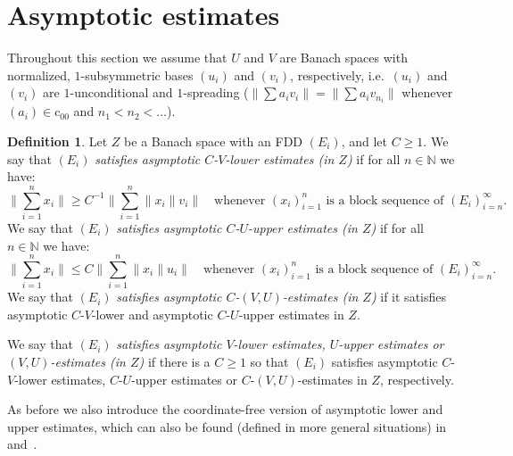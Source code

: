 \documentclass[11pt,leqno]{amsart}
\theoremstyle{definition}
\newtheorem*{defin}{Definition}
\newcommand{\N}{\mathbb{N}}
\newcommand{\coo}{\mathrm{c}_{00}}
\begin{document}
\section{Asymptotic estimates}\label{S:4}

Throughout this section we assume that $U$ and $V$ are Banach spaces
with normalized, $1$-subsymmetric bases $(u_i)$ and $(v_i)$,
respectively, i.e.~$(u_i)$ and $(v_i)$ are $1$-unconditional and
$1$-spreading ($\|\sum a_i v_i\|=\|\sum a_i v_{n_i}\|$ whenever
$(a_i)\in \coo$ and $n_1<n_2<\ldots$).
\begin{defin}
  Let $Z$ be a Banach space with an FDD $(E_i)$, and let $C\ge 1$. We
  say that $(E_i)$ {\em satisfies asymptotic $C$-$V$-lower estimates
    (in $Z$) }if for all $n\in\N$ we have:
  \begin{equation*}
    \Big\|\sum_{i=1}^n x_i\Big\|\ge C^{-1} \Big\|\sum_{i=1}^n
    \|x_i\|v_i\Big\|\quad\text{whenever $(x_i)_{i=1}^n$ is a block
      sequence of $(E_i)_{i=n}^\infty$}.
  \end{equation*}
  We say that $(E_i)$ {\em satisfies asymptotic $C$-$U$-upper
    estimates (in $Z$) }if for all $n\in\N$ we have:
  \begin{equation*}
    \Big\|\sum_{i=1}^n x_i\Big\|\le C \Big\|\sum_{i=1}^n
    \|x_i\|u_i\Big\|\quad\text{whenever $(x_i)_{i=1}^n$ is a block
      sequence of $(E_i)_{i=n}^\infty$}.
  \end{equation*}
  We say that $(E_i)$ {\em satisfies asymptotic $C$-$(V,U)$-estimates
    (in $Z$)} if it satisfies asymptotic $C$-$V$-lower and asymptotic
  $C$-$U$-upper estimates in $Z$.

  We say that $(E_i)$ {\em satisfies asymptotic $V$-lower estimates,
    $U$-upper estimates or $(V,U)$-estimates (in $Z$) }if there is a
  $C\geq 1$ so that $(E_i)$ satisfies asymptotic $C$-$V$-lower
  estimates, $C$-$U$-upper estimates or $C$-$(V,U)$-estimates in $Z$,
  respectively.
\end{defin}

As before we also introduce the coordinate-free version of asymptotic
lower and upper estimates, which can also be found (defined in  more
general situations) in~\cite{MT} and~\cite{MMT}.
\end{document}
